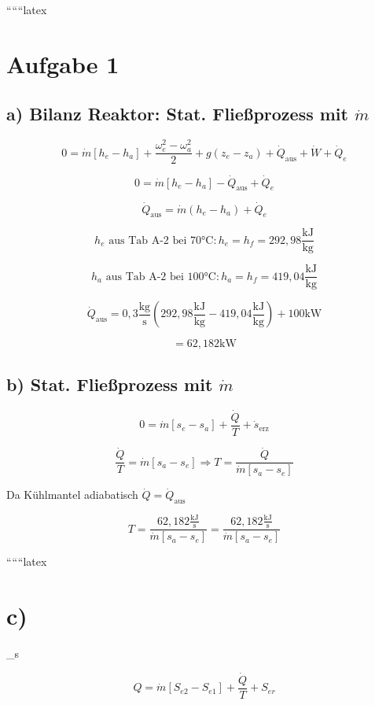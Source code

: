 
``````latex


\section*{Aufgabe 1}

\subsection*{a) Bilanz Reaktor: Stat. Fließprozess mit $\dot{m}$}

\[
0 = \dot{m} [h_e - h_a] + \frac{\omega_e^2 - \omega_a^2}{2} + g(z_e - z_a) + \dot{Q}_{\text{aus}} + \dot{W} + \dot{Q}_e
\]

\[
0 = \dot{m} [h_e - h_a] - \dot{Q}_{\text{aus}} + \dot{Q}_e
\]

\[
\dot{Q}_{\text{aus}} = \dot{m} (h_e - h_a) + \dot{Q}_e
\]

\[
h_e \text{ aus Tab A-2 bei 70°C}: h_e = h_f = 292{,}98 \frac{\text{kJ}}{\text{kg}}
\]

\[
h_a \text{ aus Tab A-2 bei 100°C}: h_a = h_f = 419{,}04 \frac{\text{kJ}}{\text{kg}}
\]

\[
\dot{Q}_{\text{aus}} = 0{,}3 \frac{\text{kg}}{\text{s}} \left( 292{,}98 \frac{\text{kJ}}{\text{kg}} - 419{,}04 \frac{\text{kJ}}{\text{kg}} \right) + 100 \text{kW}
\]

\[
= 62{,}182 \text{kW}
\]

\subsection*{b) Stat. Fließprozess mit $\dot{m}$}

\[
0 = \dot{m} [s_e - s_a] + \frac{\dot{Q}}{T} + \dot{s}_{\text{erz}}
\]

\[
\frac{\dot{Q}}{T} = \dot{m} [s_a - s_e] \Rightarrow T = \frac{\dot{Q}}{\dot{m} [s_a - s_e]}
\]

Da Kühlmantel adiabatisch $\dot{Q} = \dot{Q}_{\text{aus}}$

\[
T = \frac{62{,}182 \frac{\text{kJ}}{\text{s}}}{\dot{m} [s_a - s_e]} = \frac{62{,}182 \frac{\text{kJ}}{\text{s}}}{\dot{m} [s_a - s_e]}
\]

``````latex

\section*{c)}

 _s

\[
Q = \dot{m} [S_{e2} - S_{e1}] + \frac{\dot{Q}}{T} + S_{er}
\]

